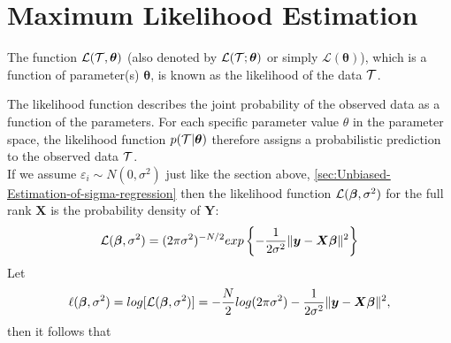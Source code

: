 \section{Maximum Likelihood Estimation}
\label{sec:Maximum-Likelihood-Estimation-Regression}
\begin{deff}[Likelihood]
The function $\mathcal{L}(\mathcal{T}, \bm \theta)$ 
(also denoted by $\mathcal{L}(\mathcal{T}; \bm \theta)$ or 
simply $\mathcal{L} (\bm \theta)$), 
which is a function of 
parameter(s) $\bm \theta$, is known as the 
likelihood of the data $\mathcal{T}$.
\end{deff}
\noindent The likelihood function describes the joint probability 
of the observed data as a function of the parameters.
For each specific parameter value $\theta$  in the parameter space, the likelihood function $p(\mathcal{T} | \bm \theta )$ therefore assigns a probabilistic prediction to the observed data $\mathcal{T}$.\\

If we assume $\varepsilon_i \sim N(0, \sigma^2)$ just like
the section above, \cref{sec:Unbiased-Estimation-of-sigma-regression} 
then the likelihood function $\mathcal{L}(\bm \beta, \sigma^2)$
for the full rank $\bm X$ is the probability density of $\bm Y$:
\[\mathcal{L}(\bm \beta, \sigma^2) = (2\pi\sigma^2)^{-N/2} 
exp \left \{ -\frac{1}{2\sigma^2} \lVert{\bm y - \bm X \bm \beta}\rVert^2 \right \}\]
Let 
\[
\ell(\bm \beta, \sigma^2) = log[\mathcal{L}(\bm \beta, \sigma^2)] 
 = -\frac{N}{2}log(2\pi\sigma^2) - \frac{1}{2\sigma^2} \lVert{\bm y - \bm X \bm \beta}\rVert^2,
 \]
then it follows that



